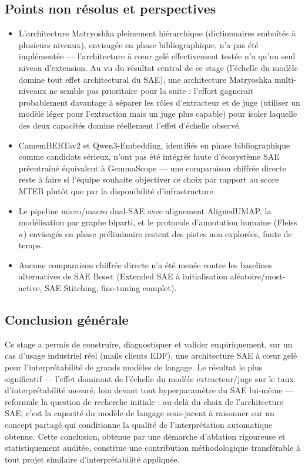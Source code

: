 \documentclass[11pt]{article}
\begin{document}
\subsection{Points non résolus et perspectives}

\begin{itemize}
  \item L'architecture Matryoshka pleinement hiérarchique (dictionnaires
    emboîtés à plusieurs niveaux), envisagée en phase bibliographique,
    n'a pas été implémentée --- l'architecture à cœur gelé effectivement
    testée n'a qu'un seul niveau d'extension. Au vu du résultat central de ce
    stage (l'échelle du modèle domine tout effet architectural du SAE), une
    architecture Matryoshka multi-niveaux ne semble pas prioritaire pour la
    suite : l'effort gagnerait probablement davantage à séparer les rôles
    d'extracteur et de juge (utiliser un modèle léger pour l'extraction mais
    un juge plus capable) pour isoler laquelle des deux capacités domine
    réellement l'effet d'échelle observé.
  \item CamemBERTav2 et Qwen3-Embedding, identifiés en phase bibliographique
    comme candidats sérieux, n'ont pas été intégrés faute d'écosystème SAE
    préentraîné équivalent à GemmaScope --- une comparaison chiffrée directe
    reste à faire si l'équipe souhaite objectiver ce choix par rapport au
    score MTEB plutôt que par la disponibilité d'infrastructure.
  \item Le pipeline micro/macro dual-SAE avec alignement AlignedUMAP, la
    modélisation par graphe biparti, et le protocole d'annotation humaine
    (Fleiss $\kappa$) envisagés en phase préliminaire restent des pistes non
    explorées, faute de temps.
  \item Aucune comparaison chiffrée directe n'a été menée contre les
    baselines alternatives de SAE Boost (Extended SAE à initialisation
    aléatoire/most-active, SAE Stitching, fine-tuning complet).
\end{itemize}

\subsection{Conclusion générale}

Ce stage a permis de construire, diagnostiquer et valider empiriquement, sur
un cas d'usage industriel réel (mails clients EDF), une architecture SAE à
cœur gelé pour l'interprétabilité de grands modèles de langage. Le résultat
le plus significatif --- l'effet dominant de l'échelle du modèle
extracteur/juge sur le taux d'interprétabilité mesuré, loin devant tout
hyperparamètre du SAE lui-même --- reformule la question de recherche
initiale : au-delà du choix de l'architecture SAE, c'est la capacité du
modèle de langage sous-jacent à raisonner sur un concept partagé qui
conditionne la qualité de l'interprétation automatique obtenue. Cette
conclusion, obtenue par une démarche d'ablation rigoureuse et statistiquement
auditée, constitue une contribution méthodologique transférable à tout projet
similaire d'interprétabilité appliquée.
\end{document}
